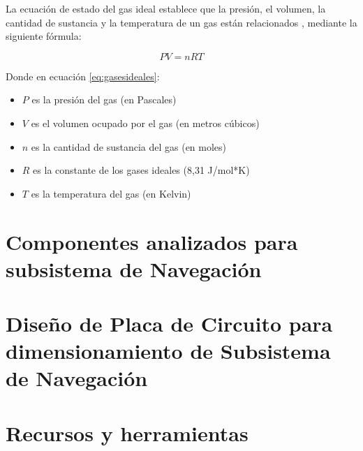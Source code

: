 La ecuación de estado del gas ideal establece que la presión, el volumen, la cantidad de sustancia y la temperatura de un gas están relacionados \cite{libro_fisica_giancoli}, mediante la siguiente fórmula:

\begin{equation}
    \label{eq:gasesideales}
    PV = nRT 
\end{equation}


Donde en ecuación \ref{eq:gasesideales}:

\begin{itemize}
    \item $P$ es la presión del gas (en Pascales)
    \item  $V$ es el volumen ocupado por el gas (en metros cúbicos)
    \item  $n$ es la cantidad de sustancia del gas (en moles)
    \item  $R$ es la constante de los gases ideales (8,31 J/mol*K)
    \item  $T$ es la temperatura del gas (en Kelvin)
\end{itemize}


\newpage

\section{Componentes analizados para subsistema de Navegación} \label{chp:anexo:componentes_analizados&extras}




\section{Diseño de Placa de Circuito para dimensionamiento de Subsistema de Navegación} \label{chp:anexo:pcb_layout_esquematico}





\newpage

\section{Recursos y herramientas}  \label{chp:anexo:source_thesis}

